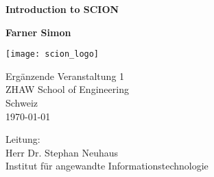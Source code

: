 \begin{titlepage}
    \thispagestyle{frontpage}
    \begin{center}

        \vspace*{5cm}
        
        \Huge
        \textbf{Introduction to SCION}
        
        \vspace{0.5cm}
        
        
        \vspace{1.5cm}
        
        \textbf{Farner Simon}

        \vfill

        \texttt{[image: scion\_logo]}
        \vfill

        \begin{minipage}[t]{0.4\textwidth}
        \normalsize
        Ergänzende Veranstaltung 1 \\
        ZHAW School of Engineering \\
        Schweiz\\
        \today
        \end{minipage}
        \begin{minipage}[t]{0.4\textwidth}
        \normalsize
        \raggedright
        Leitung:\\
        Herr Dr. Stephan Neuhaus \\
        Institut für angewandte Informations­technologie\\
        \end{minipage}

    \end{center}
\end{titlepage}
